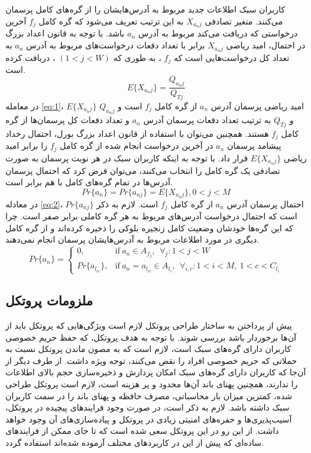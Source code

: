 کاربران سبک اطلاعات جدید مربوط به آدرس‌هایشان را از گره‌های کامل پرسمان می‌کنند. متغیر تصادفی $X_{{a_n}j}$ به این ترتیب تعریف می‌شود که گره کامل $f_j$ آخرین درخواستی که دریافت می‌کند مربوط به آدرس $a_n$ باشد. با توجه به قانون اعداد بزرگ در احتمال، امید ریاضی $X_{{a_n}j}$‌ برابر با تعداد  دفعات درخواست‌های مربوط به آدرس $a_n$ به تعداد کل درخواست‌هایی است که 
$f_j$
، به طوری که
$(1<j<W)$
، دریافت کرده است.
\begin{equation}
E\{X_{{a_n}j}\} = \frac{Q_{{a_n}j}}{Q_{Tj}} \label{eq:1}
\end{equation}
در معامله \eqref{eq:1}،
$E\{X_{{a_n}j}\}$
امید ریاضی پرسمان آدرس $a_n$ از گره کامل
$f_j$ 
است و
$Q_{{a_n}j}$
و
$Q_{Tj}$
به ترتیب تعداد دفعات پرسمان آدرس $a_n$ و تعداد دفعات کل پرسمان‌ها از گره کامل $f_j$ هستند. همچنین می‌توان با استفاده از قانون اعداد بزرگ بورل، احتمال رخداد پیشامد پرسمان $a_n$ در آخرین درخواست انجام شده از گره کامل $f_j$ را برابر امید ریاضی
$E\{X_{{a_n}j}\}$
قرار داد. با توجه به اینکه کاربران سبک در هر نوبت پرسمان به صورت تصادفی یک گره کامل را انتخاب می‌کنند، می‌توان فرض کرد که احتمال پرسمان آدرس‌ها در تمام گره‌های کامل با هم برابر است.
\begin{equation}
Pr\{a_{n}\} = Pr\{a_{nj}\} = E\{X_{{a_n}j}\}, 0<j<M \label{eq:2}
\end{equation}
در معادله \eqref{eq:2}، 
$Pr\{a_{nj}\}$
احتمال پرسمان آدرس $a_n$ از گره کامل
$f_j$ 
است. لازم به ذکر است که احتمال درخواست آدرس‌های مربوط به هر گره‌ کاملی برابر صفر است. چرا که این گره‌ها خودشان وضعیت کامل زنجیره بلوکی را ذخیره کرده‌اند و از گره کامل دیگری در مورد اطلاعات مربوط به آدرس‌هایشان پرسمان انجام نمی‌دهند.
\begin{equation}
Pr\{{a_n}\} = 
\begin{cases}
0, & \text{if}\ a_n \in A_{f_j},\ \ \forall_{j} : 1<j<W \\
Pr\{{a_{l_{ic}}}\}, & \text{if}\ a_n = a_{l_{ic}} \in A_{l_i},\ \ \forall_{i,c} : 1<i<M,\  1<c<C_{l_i}
\end{cases} \label{eq:3}
\end{equation} 

\subsection{ملزومات پروتکل}
\label{subsubsection:4.2}
پیش از پرداختن به ساختار طراحی پروتکل لازم است ویژگی‌هایی که پروتکل باید از آن‌ها برخوردار باشد بررسی شوند. با توجه به هدف پروتکل، که حفظ حریم خصوصی کاربران دارای گره‌های سبک است، لازم است که به مصون ماندن پروتکل نسبت به حملاتی که حریم خصوصی افراد را نقض می‌کنند، توجه ویژه داشت. از طرف دیگر از آن‌جا که کاربران دارای گره‌های سبک امکان پردازش‌ و ذخیره‌سازی حجم بالای اطلاعات را ندارند، همچنین پهنای باند آن‌ها محدود و پر هزینه است، لازم است پروتکل طراحی شده، کمترین میزان بار محاسباتی،‌ مصرف حافظه و پهنای باند را در سمت کاربران سبک داشته باشد. لازم به ذکر است، در صورت وجود فرایند‌های پیچیده در پروتکل، آسیب‌پذیری‌ها و حفره‌های امنیتی زیادی در پروتکل و پیاده‌سازی‌های آن وجود خواهد داشت. از این رو در این پروتکل سعی شده است که تا جای ممکن از فرایند‌های ساده‌ای که پیش از این در کاربرد‌های مختلف آزموده شده‌اند استفاده گردد.

